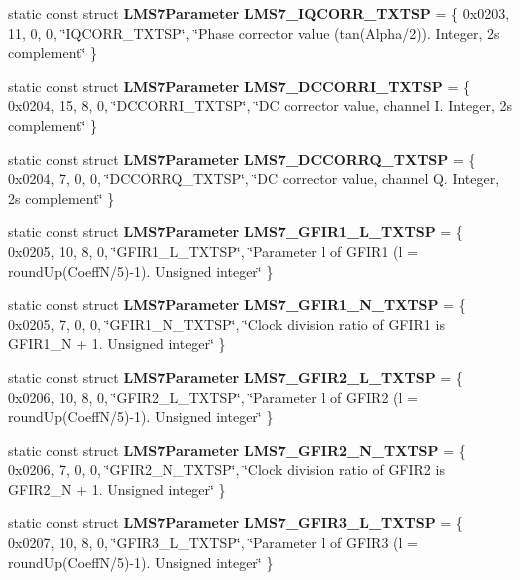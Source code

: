 \begin{DoxyCompactItemize}
\item 
static const struct {\bf L\+M\+S7\+Parameter} {\bf L\+M\+S7\+\_\+\+I\+Q\+C\+O\+R\+R\+\_\+\+T\+X\+T\+SP} = \{ 0x0203, 11, 0, 0, \char`\"{}\+I\+Q\+C\+O\+R\+R\+\_\+\+T\+X\+T\+S\+P\char`\"{}, \char`\"{}\+Phase corrector value (tan(\+Alpha/2)). Integer, 2\textquotesingle{}s complement\char`\"{} \}
\item 
static const struct {\bf L\+M\+S7\+Parameter} {\bf L\+M\+S7\+\_\+\+D\+C\+C\+O\+R\+R\+I\+\_\+\+T\+X\+T\+SP} = \{ 0x0204, 15, 8, 0, \char`\"{}\+D\+C\+C\+O\+R\+R\+I\+\_\+\+T\+X\+T\+S\+P\char`\"{}, \char`\"{}\+D\+C corrector value, channel I. Integer, 2\textquotesingle{}s complement\char`\"{} \}
\item 
static const struct {\bf L\+M\+S7\+Parameter} {\bf L\+M\+S7\+\_\+\+D\+C\+C\+O\+R\+R\+Q\+\_\+\+T\+X\+T\+SP} = \{ 0x0204, 7, 0, 0, \char`\"{}\+D\+C\+C\+O\+R\+R\+Q\+\_\+\+T\+X\+T\+S\+P\char`\"{}, \char`\"{}\+D\+C corrector value, channel Q. Integer, 2\textquotesingle{}s complement\char`\"{} \}
\item 
static const struct {\bf L\+M\+S7\+Parameter} {\bf L\+M\+S7\+\_\+\+G\+F\+I\+R1\+\_\+\+L\+\_\+\+T\+X\+T\+SP} = \{ 0x0205, 10, 8, 0, \char`\"{}\+G\+F\+I\+R1\+\_\+\+L\+\_\+\+T\+X\+T\+S\+P\char`\"{}, \char`\"{}\+Parameter l of G\+F\+I\+R1 (l = round\+Up(\+Coeff\+N/5)-\/1). Unsigned integer\char`\"{} \}
\item 
static const struct {\bf L\+M\+S7\+Parameter} {\bf L\+M\+S7\+\_\+\+G\+F\+I\+R1\+\_\+\+N\+\_\+\+T\+X\+T\+SP} = \{ 0x0205, 7, 0, 0, \char`\"{}\+G\+F\+I\+R1\+\_\+\+N\+\_\+\+T\+X\+T\+S\+P\char`\"{}, \char`\"{}\+Clock division ratio of G\+F\+I\+R1 is G\+F\+I\+R1\+\_\+\+N + 1. Unsigned integer\char`\"{} \}
\item 
static const struct {\bf L\+M\+S7\+Parameter} {\bf L\+M\+S7\+\_\+\+G\+F\+I\+R2\+\_\+\+L\+\_\+\+T\+X\+T\+SP} = \{ 0x0206, 10, 8, 0, \char`\"{}\+G\+F\+I\+R2\+\_\+\+L\+\_\+\+T\+X\+T\+S\+P\char`\"{}, \char`\"{}\+Parameter l of G\+F\+I\+R2 (l = round\+Up(\+Coeff\+N/5)-\/1). Unsigned integer\char`\"{} \}
\item 
static const struct {\bf L\+M\+S7\+Parameter} {\bf L\+M\+S7\+\_\+\+G\+F\+I\+R2\+\_\+\+N\+\_\+\+T\+X\+T\+SP} = \{ 0x0206, 7, 0, 0, \char`\"{}\+G\+F\+I\+R2\+\_\+\+N\+\_\+\+T\+X\+T\+S\+P\char`\"{}, \char`\"{}\+Clock division ratio of G\+F\+I\+R2 is G\+F\+I\+R2\+\_\+\+N + 1. Unsigned integer\char`\"{} \}
\item 
static const struct {\bf L\+M\+S7\+Parameter} {\bf L\+M\+S7\+\_\+\+G\+F\+I\+R3\+\_\+\+L\+\_\+\+T\+X\+T\+SP} = \{ 0x0207, 10, 8, 0, \char`\"{}\+G\+F\+I\+R3\+\_\+\+L\+\_\+\+T\+X\+T\+S\+P\char`\"{}, \char`\"{}\+Parameter l of G\+F\+I\+R3 (l = round\+Up(\+Coeff\+N/5)-\/1). Unsigned integer\char`\"{} \}

\end{DoxyCompactItemize}
